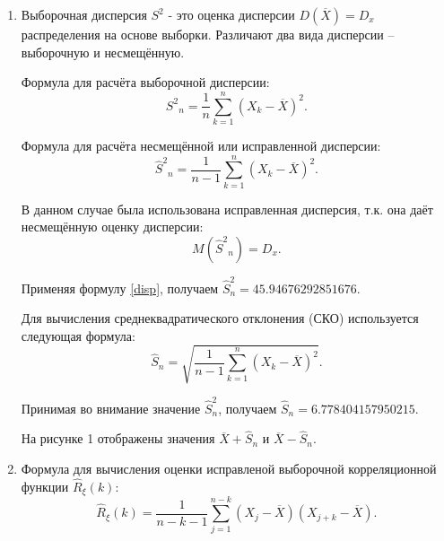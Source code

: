 \documentclass[12pt, fleqn]{article}
\begin{document}
{\begin{enumerate}
{			Используя программу из приложения А, получаем $\overline{X} = -25.072198200000003$.
																		        
			На рисунке 1 показано значение $ \overline{X} $.
		}
		\item
		      {
		      	Выборочная дисперсия $S^2$ - это оценка дисперсии $D(\overline{X})=D_x$ распределения на основе выборки.
		      	Различают два вида дисперсии -- выборочную и несмещённую.
		      			      			      			      			      			      	        
		      	Формула для расчёта выборочной дисперсии:
		      	\begin{equation}
		      		{S^2}_n=\frac{1}{n}\sum_{k=1}^{n}{(X_k - \overline{X})^2}.
		      	\end{equation}
		      			      			      			      			      			      	        
		      	Формула для расчёта несмещённой или исправленной дисперсии:
		      	\begin{equation}\label{disp}
		      		{\hat{S}^2}_n=\frac{1}{n-1}\sum_{k=1}^{n}{(X_k - \overline{X})^2}.
		      	\end{equation}
		      			      			      			      			      			      	        
		      	В данном случае была использована исправленная дисперсия, т.к. она даёт несмещённую оценку дисперсии:
		      	\begin{equation}
		      		M({\hat{S}^2}_n)=D_x.
		      	\end{equation}
		      			      			      			      			      			      	        
		      	Применяя формулу \eqref{disp}, получаем $\hat{S}^2_n = 45.94676292851676$.
		      			      			      			      			      			      	        
		      	Для вычисления среднеквадратического отклонения (СКО) используется следующая формула:
		      	\begin{equation}
		      		\hat{S}_n=\sqrt{\frac{1}{n-1}\sum_{k=1}^{n}{(X_k - \overline{X})^2}}.
		      	\end{equation}
		      			      			      			      			      			      	        
		      	Принимая во внимание значение $ \hat{S}^2_n $, получаем $ \hat{S}_n = 6.778404157950215 $.
		      			      			      			      			      			      	        
		      	На рисунке 1 отображены значения $ \overline{X} + \hat{S}_n $ и $ \overline{X} - \hat{S}_n $.
		      }
		\item
		      {
		      	Формула для вычисления оценки исправленой выборочной корреляционной функции $ \hat{R}_\xi(k) $:		      			      			      			      		  	
		      	\begin{equation}\label{corr_func}
		      		\hat{R}_\xi(k) = \frac{1}{n - k - 1} \sum_{j=1}^{n - k} {(X_j - \overline{X})(X_{j+k}-\overline{X})}.
		      	\end{equation}
		      			      			      			      			      			      		  	
}
\end{enumerate}}
\end{document}
